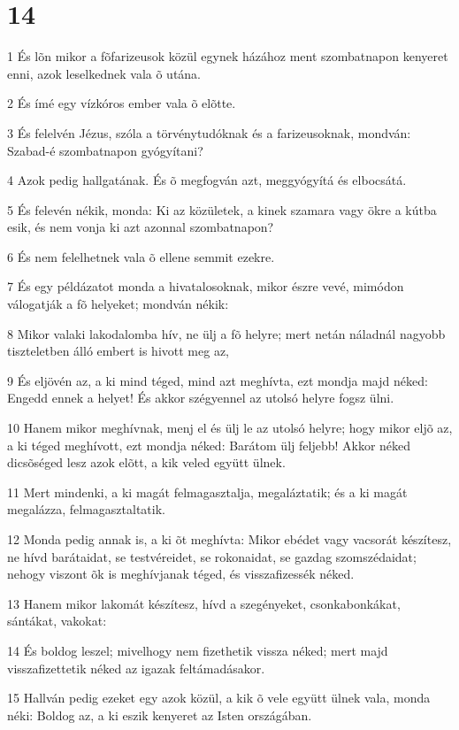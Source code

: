 \chapter{14}

\par 1 És lõn mikor a fõfarizeusok közül egynek házához ment szombatnapon kenyeret enni, azok leselkednek vala õ utána.
\par 2 És ímé egy vízkóros ember vala õ elõtte.
\par 3 És felelvén Jézus, szóla a törvénytudóknak és a farizeusoknak, mondván: Szabad-é szombatnapon gyógyítani?
\par 4 Azok pedig hallgatának. És õ megfogván azt, meggyógyítá és elbocsátá.
\par 5 És felevén nékik, monda: Ki az közületek, a kinek szamara vagy ökre a kútba esik, és nem vonja ki azt azonnal szombatnapon?
\par 6 És nem felelhetnek vala õ ellene semmit ezekre.
\par 7 És egy példázatot monda a hivatalosoknak, mikor észre vevé, mimódon válogatják a fõ helyeket; mondván nékik:
\par 8 Mikor valaki lakodalomba hív, ne ülj a fõ helyre; mert netán náladnál nagyobb tiszteletben álló embert is hivott meg az,
\par 9 És eljövén az, a ki mind téged, mind azt meghívta, ezt mondja majd néked: Engedd ennek a helyet! És akkor szégyennel az utolsó helyre fogsz ülni.
\par 10 Hanem mikor meghívnak, menj el és ülj le az utolsó helyre; hogy mikor eljõ az, a ki téged meghívott, ezt mondja néked: Barátom ülj feljebb! Akkor néked dicsõséged lesz azok elõtt, a kik veled együtt ülnek.
\par 11 Mert mindenki, a ki magát felmagasztalja, megaláztatik; és a ki magát megalázza, felmagasztaltatik.
\par 12 Monda pedig annak is, a ki õt meghívta: Mikor ebédet vagy vacsorát készítesz, ne hívd barátaidat, se testvéreidet, se rokonaidat, se gazdag szomszédaidat; nehogy viszont õk is meghívjanak téged, és visszafizessék néked.
\par 13 Hanem mikor lakomát készítesz, hívd a szegényeket, csonkabonkákat, sántákat, vakokat:
\par 14 És boldog leszel; mivelhogy nem fizethetik vissza néked; mert majd visszafizettetik néked az igazak feltámadásakor.
\par 15 Hallván pedig ezeket egy azok közül, a kik õ vele együtt ülnek vala, monda néki: Boldog az, a ki eszik kenyeret az Isten országában.
